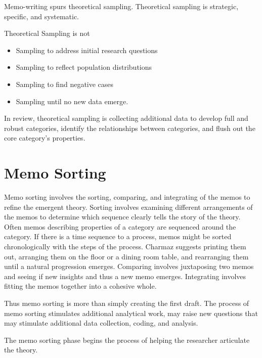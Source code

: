 Memo-writing spurs theoretical sampling. Theoretical sampling is strategic, specific, and systematic.

Theoretical Sampling is not 
\begin{itemize}
\item Sampling to address initial research questions 
\item Sampling to reflect population distributions
\item Sampling to find negative cases
\item Sampling until no new data emerge. \cite{Charmaz}
\end{itemize}


In review, theoretical sampling is collecting additional data to develop full and robust categories, identify the relationships between categories, and flush out the core category's properties.

\section{Memo Sorting}
Memo sorting involves the sorting, comparing, and integrating of the memos to refine the emergent theory. Sorting involves examining different arrangements of the memos to determine which sequence clearly tells the story of the theory. Often memos describing properties of a category are sequenced around the category. If there is a time sequence to a process, memos might be sorted chronologically with the steps of the process. Charmaz suggests printing them out, arranging them on the floor or a dining room table, and rearranging them until a natural progression emerges. Comparing involves juxtaposing two memos and seeing if new insights and thus a new memo emerges. Integrating involves fitting the memos together into a cohesive whole. 

Thus memo sorting is more than simply creating the first draft. The process of memo sorting stimulates additional analytical work, may raise new questions that may stimulate additional data collection, coding, and analysis. 

The memo sorting phase begins the process of helping the researcher articulate the theory.

